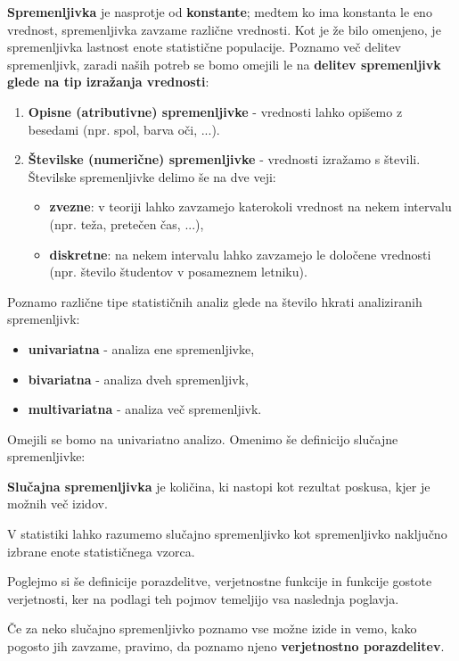 \textbf{Spremenljivka} je nasprotje od \textbf{konstante}; medtem ko ima konstanta le eno vrednost, spremenljivka zavzame različne vrednosti. Kot je že bilo omenjeno, je spremenljivka lastnost enote statistične populacije. Poznamo več delitev spremenljivk, zaradi naših potreb se bomo omejili le na \textbf{delitev spremenljivk glede na tip izražanja vrednosti}:
\begin{enumerate}
	\item \textbf{Opisne (atributivne) spremenljivke} - vrednosti lahko opišemo z besedami (npr. spol, barva oči, ...).
	\item \textbf{Številske (numerične) spremenljivke} - vrednosti izražamo s števili. Številske spremenljivke delimo še na dve veji:
		\begin{itemize}
			\item \textbf{zvezne}: v teoriji lahko zavzamejo katerokoli vrednost na nekem intervalu (npr. teža, pretečen čas, ...),
			\item \textbf{diskretne}: na nekem intervalu lahko zavzamejo le določene vrednosti (npr. število študentov v posameznem letniku).
		\end{itemize}
\end{enumerate}

Poznamo različne tipe statističnih analiz glede na število hkrati analiziranih spremenljivk:
\begin{itemize}
	\item \textbf{univariatna} - analiza ene spremenljivke,
	\item \textbf{bivariatna} - analiza dveh spremenljivk,
	\item \textbf{multivariatna} - analiza več spremenljivk.
\end{itemize}

Omejili se bomo na univariatno analizo. Omenimo še definicijo slučajne spremenljivke:

\begin{definicija}
	\textbf{Slučajna spremenljivka} je količina, ki nastopi kot rezultat poskusa, kjer je možnih več izidov.
\end{definicija}

V statistiki lahko razumemo slučajno spremenljivko kot spremenljivko naključno izbrane enote statističnega vzorca.

Poglejmo si še definicije porazdelitve, verjetnostne funkcije in funkcije gostote verjetnosti, ker na podlagi teh pojmov temeljijo vsa naslednja poglavja.

\begin{definicija}
	Če za neko slučajno spremenljivko poznamo vse možne izide in vemo, kako pogosto jih zavzame, pravimo, da poznamo njeno \textbf{verjetnostno porazdelitev}.	
\end{definicija}

